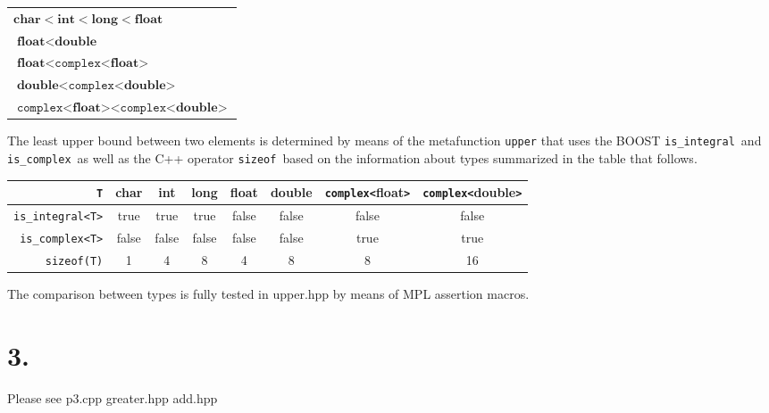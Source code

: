 \documentclass[12pt,a4paper]{article}
\newcommand{\bchar}{\textbf{char}}
\newcommand{\blong}{\textbf{long}}
\newcommand{\bint}{\textbf{int}}
\newcommand{\bfloat}{\textbf{float}}
\newcommand{\bdouble}{\textbf{double}}
\newcommand{\complex}{\texttt{complex}}
\newcommand{\sizeof}{\texttt{sizeof}}
\newcommand{\isintegral}{\texttt{is\_integral}}
\newcommand{\iscomplex}{\texttt{is\_complex}}
\begin{document}
\vspace{.5cm}
\begin{scriptsize}
\begin{tabular}{|l|}
\hline
$ \bchar < \bint <\blong < \bfloat $ \\
$ \bfloat < \bdouble $ \\
$ \bfloat < \complex\texttt{<}\bfloat\texttt{>} $ \\
$ \bdouble < \complex\texttt{<}\bdouble\texttt{>} $ \\
$ \complex\texttt{<}\bfloat\texttt{>} < \complex\texttt{<}\bdouble\texttt{>} $ \\
\hline
\end{tabular}
\end{scriptsize}
\vspace{.5cm}

The least upper bound between two elements is determined by means of the metafunction \texttt{upper} that uses the BOOST \isintegral\ and \iscomplex\ as well as the C++ operator \sizeof\ based on the information about types summarized in the table that follows.

\vspace{.5cm}
\begin{scriptsize}
\begin{tabular}{|r|ccccccc|}
  \hline
  \texttt{T}\hspace{.2cm} & \bchar & \bint   & \blong & \bfloat  & \bdouble & \complex\texttt{<}\bfloat \texttt{>} & \complex\texttt{<}\bdouble\texttt{>} \\
  \hline
  \isintegral \texttt{<T>}   & true      & true   & true     & false    & false         & false                     & false \\
  \iscomplex \texttt{<T>} & false     & false & false   & false    & false         & true                       & true \\
  \sizeof \texttt{(T)}           &  1          &  4       &  8        &  4         &  8              &  8                          &  16 \\
  \hline
\end{tabular}
\end{scriptsize}
\vspace{.5cm}

The comparison between types is fully tested in upper.hpp by means of MPL assertion macros.



\section*{ 3. }
Please see p3.cpp greater.hpp add.hpp
\end{document}
